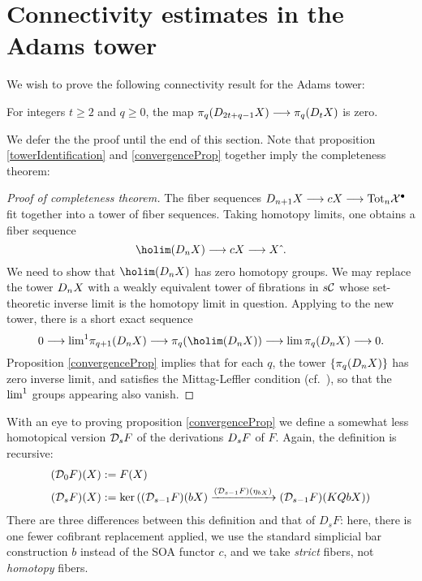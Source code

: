 \documentclass[11pt]{amsart}
\theoremstyle{plain}
\newcommand{\dupdown}[2]{D_{\smash{#1}}}
\newcommand{\caldup}[1]{\calD_{\smash{#1}}}
\begin{document}
\section{Connectivity estimates in the Adams tower}
\label{sec:connectivityAnalysis}
We wish to prove the following connectivity result for the Adams tower:
\begin{prop}\label{convergenceProp}
For integers $t\geq2$ and $q\geq0$, the map $\pi_q(\dupdown{2t+q-1}{c}X)\to\pi_q(\dupdown{t}{c}X)$ is zero.
\end{prop}
\noindent We defer the the proof until the end of this section. Note that proposition \ref{towerIdentification} and \ref{convergenceProp} together imply the completeness theorem:
\begin{proof}[Proof of completeness theorem]
The fiber sequences $\dupdown{n+1}{c}X\to cX\to \textup{Tot}_n\calX^\bullet$ fit together into a tower of fiber sequences. Taking homotopy limits, one obtains a fiber sequence
\[\holim (\dupdown{n}{c}X)\to cX\to X\hat{\ }.\]
We need to show that $\holim (\dupdown{n}{c}X)$ has zero homotopy groups.
We may replace the tower $\dupdown{n}{c}X$ with a weakly equivalent tower of fibrations in $s\mathcal{C}$ whose set-theoretic inverse limit is the homotopy limit in question. Applying \cite[Proposition 6.14]{goerss-jardine.pdf} to the new tower, there is a short exact sequence
\[0\to \textup{lim}^1\pi_{q+1}(\dupdown{n}{c}X)\to \pi_q(\holim (\dupdown{n}{c}X))\to \textup{lim}\,\pi_{q}(\dupdown{n}{c}X)\to 0.\]
Proposition \ref{convergenceProp} implies that for each $q$, the tower $\{\pi_{q}(\dupdown{n}{c}X)\}$ has zero inverse limit, and satisfies the Mittag-Leffler condition (cf.\ \cite[p.264]{YellowMonster}), so that the $\textup{lim}^1$ groups appearing also vanish.
\end{proof}
With an eye to proving proposition \ref{convergenceProp} we define a somewhat less homotopical version $\caldup{s}F$ of the derivations $\dupdown{s}{b}F$ of $F$. Again, the definition is recursive:
\begin{alignat*}{2}
(\caldup{0}F)(X)
&:=
F(X)%
\\
(\caldup{s}F)(X)
&:=
\ker((\caldup{s-1}F)(bX)\xrightarrow{(\caldup{s-1}F)(\eta_{bX})} (\caldup{s-1}F)(KQbX))
\end{alignat*}
There are three differences between this definition and that of $D_sF$: here, there is one fewer cofibrant replacement applied, we use the standard simplicial bar construction $b$ instead of the SOA functor $c$, and we take \emph{strict} fibers, not \emph{homotopy} fibers.
\end{document}
